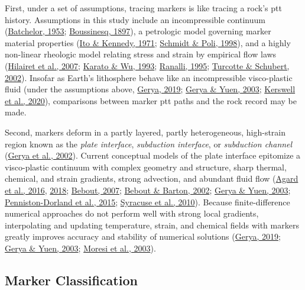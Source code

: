 First, under a set of assumptions, tracing markers is like tracing a rock's \gls{ptt} history. Assumptions in this study include an incompressible continuum (\protect\hyperlink{ref-batchelor1953}{Batchelor, 1953}; \protect\hyperlink{ref-boussinesq1897}{Boussinesq, 1897}), a petrologic model governing marker material properties (\protect\hyperlink{ref-ito1971}{Ito \& Kennedy, 1971}; \protect\hyperlink{ref-schmidt1998}{Schmidt \& Poli, 1998}), and a highly non-linear rheologic model relating stress and strain by empirical flow laws (\protect\hyperlink{ref-hilairet2007}{Hilairet et al., 2007}; \protect\hyperlink{ref-karato1993}{Karato \& Wu, 1993}; \protect\hyperlink{ref-ranalli1995}{Ranalli, 1995}; \protect\hyperlink{ref-turcotte2002}{Turcotte \& Schubert, 2002}). Insofar as Earth's lithosphere behave like an incompressible visco-plastic fluid (under the assumptions above, \protect\hyperlink{ref-gerya2019}{Gerya, 2019}; \protect\hyperlink{ref-gerya2003}{Gerya \& Yuen, 2003}; \protect\hyperlink{ref-kerswell2020}{Kerswell et al., 2020}), comparisons between marker \gls{ptt} paths and the rock record may be made.

Second, markers deform in a partly layered, partly heterogeneous, high-strain region known as the \emph{plate interface}, \emph{subduction interface}, or \emph{subduction channel} (\protect\hyperlink{ref-gerya2002}{Gerya et al., 2002}). Current conceptual models of the plate interface epitomize a visco-plastic continuum with complex geometry and structure, sharp thermal, chemical, and strain gradients, strong advection, and abundant fluid flow (\protect\hyperlink{ref-agard2016}{Agard et al., 2016}, \protect\hyperlink{ref-agard2018}{2018}; \protect\hyperlink{ref-bebout2007}{Bebout, 2007}; \protect\hyperlink{ref-bebout2002}{Bebout \& Barton, 2002}; \protect\hyperlink{ref-gerya2003}{Gerya \& Yuen, 2003}; \protect\hyperlink{ref-penniston2015}{Penniston-Dorland et al., 2015}; \protect\hyperlink{ref-syracuse2010}{Syracuse et al., 2010}). Because finite-difference numerical approaches do not perform well with strong local gradients, interpolating and updating temperature, strain, and chemical fields with markers greatly improves accuracy and stability of numerical solutions (\protect\hyperlink{ref-gerya2019}{Gerya, 2019}; \protect\hyperlink{ref-gerya2003}{Gerya \& Yuen, 2003}; \protect\hyperlink{ref-moresi2003}{Moresi et al., 2003}).

\hypertarget{marker-classification}{%
\subsection{Marker Classification}\label{marker-classification}}


